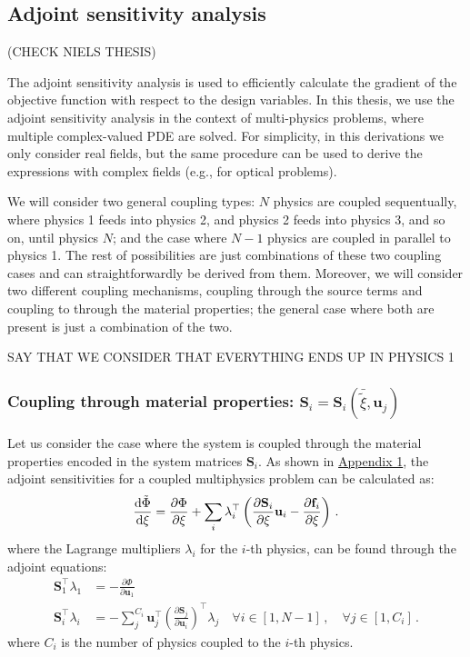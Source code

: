     \subsection*{Adjoint sensitivity analysis}

    (CHECK NIELS THESIS)

    The adjoint sensitivity analysis is used to efficiently calculate the gradient
    of the objective function with
    respect to the design variables. In this thesis, we use the adjoint sensitivity
    analysis  in the context of
    multi-physics problems, where multiple complex-valued PDE are solved. For
    simplicity, in this derivations we only consider
    real fields, but the same procedure can be used to derive the expressions with
    complex fields (e.g., for optical problems).

    We will consider two  general coupling types: $N$ physics are coupled
    sequentually, where physics 1 feeds into physics 2, and physics 2
    feeds into physics 3, and so on, until physics $N$; and the case where $N-1$
    physics are coupled in parallel to physics 1. The rest of possibilities are
    just
    combinations of these two coupling cases and can straightforwardly be derived
    from them. Moreover, we will consider two different coupling mechanisms,
    coupling through the source terms and coupling to through the material
    properties; the general case where both are present is just a combination of
    the two.

    SAY THAT WE CONSIDER THAT EVERYTHING ENDS UP IN PHYSICS 1

    \subsubsection*{Coupling through material properties: $\mathbf{S}_i =
            \mathbf{S}_i(\bar{\tilde{\xi}}, \mathbf{u}_j)$}

    Let us consider the case where the system is coupled through the material
    properties encoded in the system
    matrices $\mathbf{S}_i$. As shown in \hyperref[app:appendix1]{Appendix 1}, the
    adjoint sensitivities for a coupled multiphysics problem can be calculated as:
    \begin{equation}
        \frac{\mathop{}\!\text{d} \tilde{\Phi}}{\mathop{}\!\text{d} \xi} = \frac{\partial \Phi}{\partial \xi} +
        \sum_i \lambda_{i}^{\top} \left( \frac{\partial \mathbf{S}_i}{\partial \xi}
        \mathbf{u}_i - \frac{\partial \mathbf{f}_i}{\partial \xi} \right)\,.
    \end{equation}
    where the Lagrange multipliers $\lambda_i$ for the $i$-th physics, can be found
    through the adjoint equations:
    \begin{align}
        \mathbf{S}^\top_{1}\lambda_{1} & = - \frac{\partial \Phi}{\partial
        \mathbf{u}_{1}}\,                                                   \\
        \mathbf{S}^\top_{i}\lambda_{i} & = - \sum^{C_i}_j \mathbf{u}^\top_j
        \left(\frac{\partial \mathbf{S}_j}{\partial \mathbf{u}_{i}}\right)^\top
        \lambda_j \quad \forall i \in [1, N-1]\, , \quad \forall j \in [1, C_i] \,.
    \end{align}
    where $C_i$ is the number of physics coupled to the $i$-th physics.

